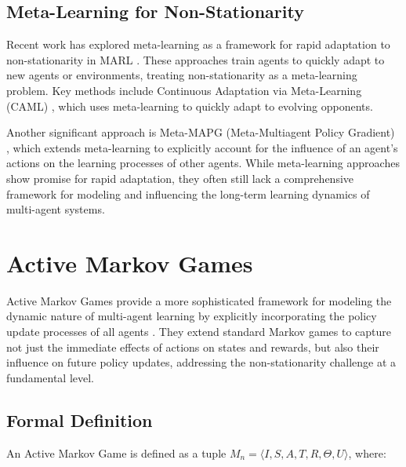 \documentclass[a4paper,12pt]{report}
\begin{document}
\subsection{Meta-Learning for Non-Stationarity}
Recent work has explored meta-learning as a framework for rapid adaptation to non-stationarity in MARL \cite{alshedivat2018continuous, kim2021policy}. These approaches train agents to quickly adapt to new agents or environments, treating non-stationarity as a meta-learning problem. Key methods include Continuous Adaptation via Meta-Learning (CAML) \cite{alshedivat2018continuous}, which uses meta-learning to quickly adapt to evolving opponents.

Another significant approach is Meta-MAPG (Meta-Multiagent Policy Gradient) \cite{kim2021policy}, which extends meta-learning to explicitly account for the influence of an agent's actions on the learning processes of other agents. While meta-learning approaches show promise for rapid adaptation, they often still lack a comprehensive framework for modeling and influencing the long-term learning dynamics of multi-agent systems.

\section{Active Markov Games}

Active Markov Games provide a more sophisticated framework for modeling the dynamic nature of multi-agent learning by explicitly incorporating the policy update processes of all agents \cite{kim2022influencing}. They extend standard Markov games to capture not just the immediate effects of actions on states and rewards, but also their influence on future policy updates, addressing the non-stationarity challenge at a fundamental level.

\subsection{Formal Definition}

An Active Markov Game is defined as a tuple $M_n = \langle I, S, A, T, R, \Theta, U \rangle$, where:
\end{document}
